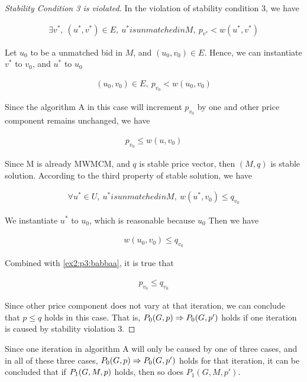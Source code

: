 \documentclass[11pt,a4paper]{article}
\begin{document}
\begin{proof}[Stability Condition 3 is violated]

    In the violation of stability condition 3, we have

    \begin{align}
        \exists v^{*},\ (u^{*}, v^{*}) \in E,\ u^{*} is unmatched in M,\ p_{v^{*}} < w(u^{*}, v^{*})
    \end{align}

    Let $u_0$ to be a unmatched bid in $M$, and $(u_0, v_0) \in E$. 
    Hence, we can instantiate $v^{*}$ to $v_0$, and $u^{*}$ to $u_0$

    \begin{align}
        (u_0, v_0) \in E,\ p_{v_0} < w(u_0, v_0)
    \end{align}
    
    Since the algorithm A in this case will increment $p_{v_0}$ by one and other
    price component remains unchanged, we have

    \begin{align} \label{ex2:p3:babbaa}
        p_{v_0} \leq w(u, v_0)
    \end{align}

    Since M is already MWMCM, and $q$ is stable price vector, then $(M, q)$ is
    stable solution. According to the third property of stable solution, we
    have

    \begin{align}
        \forall u^{*} \in U,\ u^{*} is unmatched in M,\ w(u^{*}, v_0) \leq q_{v_0}
    \end{align}

    We instantiate $u^{*}$ to $u_0$, which is reasonable because $u_0$ Then we have

    \begin{align}
        w(u_0, v_0) \leq q_{v_0}
    \end{align}

    Combined with \eqref{ex2:p3:babbaa}, it is true that

    \begin{align}
        p_{v_0} \leq q_{v_0}
    \end{align}

    Since other price component does not vary at that iteration, we can
    conclude that $p \leq q$ holds in this case. That is, $ P_0(G, p) \Rightarrow
    P_0(G, p') $ holds if one iteration is caused by stability violation 3.

\end{proof}

    Since one iteration in algorithm A will only be caused by one of three
    cases, and in all of these three cases, $ P_0(G, p) \Rightarrow
    P_0(G, p') $ holds for that iteration, it can be concluded that if $P_1(G, M, p)$
    holds, then so does $P_1(G, M, p')$.

\end{document}
